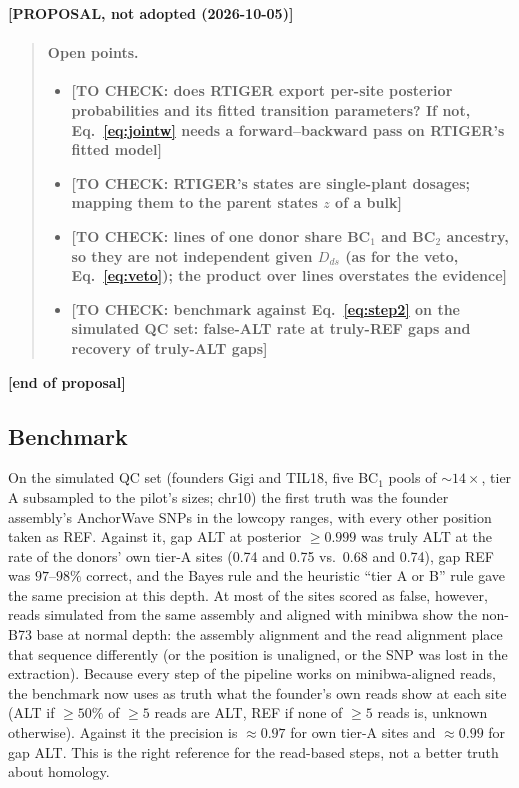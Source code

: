 \documentclass[11pt]{article}
\newcommand{\todo}[1]{\textbf{[TO CHECK: #1]}}
\newenvironment{proposal}[1]
  {\par\medskip\noindent\textbf{[PROPOSAL, not adopted (#1)]}\begin{quote}\small}
  {\end{quote}\noindent\textbf{[end of proposal]}\par\medskip}
\begin{document}
\begin{proposal}{2026-10-05}
\paragraph{Open points.}\begin{itemize}\item \todo{does RTIGER export per-site posterior probabilities and its fitted transition parameters? If not,
Eq.~\eqref{eq:jointw} needs a forward--backward pass on RTIGER's fitted model}\item \todo{RTIGER's states are single-plant dosages; mapping
them to the parent states $z$ of a bulk}\item \todo{lines of one donor share BC$_1$ and BC$_2$ ancestry, so they are not independent given
$D_{ds}$ (as for the veto, Eq.~\eqref{eq:veto}); the product over lines overstates the evidence}\item \todo{benchmark against
Eq.~\eqref{eq:step2} on the simulated QC set: false-ALT rate at truly-REF gaps and recovery of truly-ALT gaps}\end{itemize}
\end{proposal}

\subsection{Benchmark}
On the simulated QC set (founders Gigi and TIL18, five BC$_1$ pools of $\sim14\times$, tier A subsampled to the pilot's sizes; chr10) the
first truth was the founder assembly's AnchorWave SNPs in the lowcopy ranges, with every other position taken as REF. Against it, gap ALT
at posterior $\ge0.999$ was truly ALT at the rate of the donors' own tier-A sites (0.74 and 0.75 vs.\ 0.68 and 0.74), gap REF was
$97$--$98\%$ correct, and the Bayes rule and the heuristic ``tier A or B'' rule gave the same precision at this depth. At most of the sites
scored as false, however, reads simulated from the same assembly and aligned with minibwa show the non-B73 base at normal depth: the
assembly alignment and the read alignment place that sequence differently (or the position is unaligned, or the SNP was lost in the
extraction). Because every step of the pipeline works on minibwa-aligned reads, the benchmark now uses as truth what the founder's own
reads show at each site (ALT if $\ge50\%$ of $\ge5$ reads are ALT, REF if none of $\ge5$ reads is, unknown otherwise). Against it the
precision is $\approx0.97$ for own tier-A sites and $\approx0.99$ for gap ALT. This is the right reference for the read-based steps, not a
better truth about homology.
\end{document}
